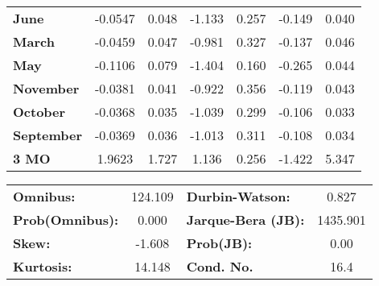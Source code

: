 \begin{center}
\begin{tabular}{lcccccc}
\textbf{June}      &      -0.0547  &        0.048     &    -1.133  &         0.257        &       -0.149    &        0.040     \\
\textbf{March}     &      -0.0459  &        0.047     &    -0.981  &         0.327        &       -0.137    &        0.046     \\
\textbf{May}       &      -0.1106  &        0.079     &    -1.404  &         0.160        &       -0.265    &        0.044     \\
\textbf{November}  &      -0.0381  &        0.041     &    -0.922  &         0.356        &       -0.119    &        0.043     \\
\textbf{October}   &      -0.0368  &        0.035     &    -1.039  &         0.299        &       -0.106    &        0.033     \\
\textbf{September} &      -0.0369  &        0.036     &    -1.013  &         0.311        &       -0.108    &        0.034     \\
\textbf{3 MO}      &       1.9623  &        1.727     &     1.136  &         0.256        &       -1.422    &        5.347     \\
\bottomrule
\end{tabular}
\begin{tabular}{lclc}
\textbf{Omnibus:}       & 124.109 & \textbf{  Durbin-Watson:     } &    0.827  \\
\textbf{Prob(Omnibus):} &   0.000 & \textbf{  Jarque-Bera (JB):  } & 1435.901  \\
\textbf{Skew:}          &  -1.608 & \textbf{  Prob(JB):          } &     0.00  \\
\textbf{Kurtosis:}      &  14.148 & \textbf{  Cond. No.          } &     16.4  \\
\bottomrule
\end{tabular}
\end{center}

